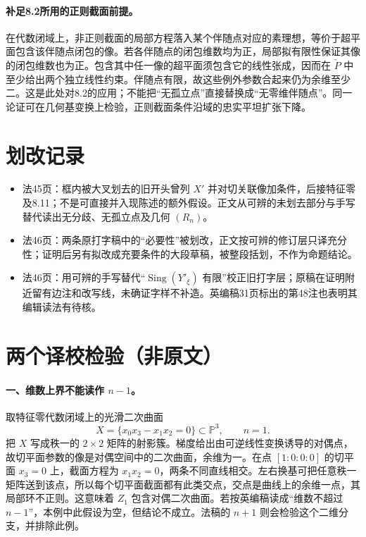 \documentclass[openany,fontset=fandol]{ctexbook}
\newcommand{\PD}{\check P}
\newcommand{\Sing}{\operatorname{Sing}}
\begin{document}
\paragraph{补足8.2所用的正则截面前提。}
在代数闭域上，非正则截面的局部方程落入某个伴随点对应的素理想，等价于超平面包含该伴随点闭包的像。若各伴随点的闭包维数均为正，局部拟有限性保证其像的闭包维数也为正。包含其中任一像的超平面须包含它的线性张成，因而在 $\PD$ 中至少给出两个独立线性约束。伴随点有限，故这些例外参数合起来仍为余维至少二。这是此处对8.2的应用；不能把“无孤立点”直接替换成“无零维伴随点”。同一论证可在几何基变换上检验，正则截面条件沿域的忠实平坦扩张下降。

\section*{划改记录}
\begin{itemize}
\item 法45页：框内被大叉划去的旧开头曾列 $X'$ 并对切关联像加条件，后接特征零及8.11；不是可直接并入现陈述的额外假设。正文从可辨的未划去部分与手写替代读出无分歧、无孤立点及几何 $(R_n)$。
\item 法46页：两条原打字稿中的“必要性”被划改，正文按可辨的修订层只译充分性；证明后另有拟改成充要条件的大段草稿，被整段括划，不作为命题结论。
\item 法46页：用可辨的手写替代“$\Sing(Y'_\xi)$ 有限”校正旧打字层；原稿在证明附近留有边注和改写线，未确证字样不补造。英编稿31页标出的第48注也表明其编辑读法有待核。
\end{itemize}

\newpage
\section*{两个译校检验（非原文）}
\paragraph{一、维数上界不能读作 $n-1$。}
取特征零代数闭域上的光滑二次曲面
\[
 X=\{x_0x_3-x_1x_2=0\}\subset\mathbb P^3,\qquad n=1.
\]
把 $X$ 写成秩一的 $2\times2$ 矩阵的射影簇。梯度给出由可逆线性变换诱导的对偶点，故切平面参数的像是对偶空间中的二次曲面，余维为一。在点 $[1:0:0:0]$ 的切平面 $x_3=0$ 上，截面方程为 $x_1x_2=0$，两条不同直线相交。左右换基可把任意秩一矩阵送到该点，所以每个切平面截面都有此类交点，交点是曲线上的余维一点，其局部环不正则。这意味着 $Z_1$ 包含对偶二次曲面。若按英编稿读成“维数不超过 $n-1$”，本例中此假设为空，但结论不成立。法稿的 $n+1$ 则会检验这个二维分支，并排除此例。
\end{document}
